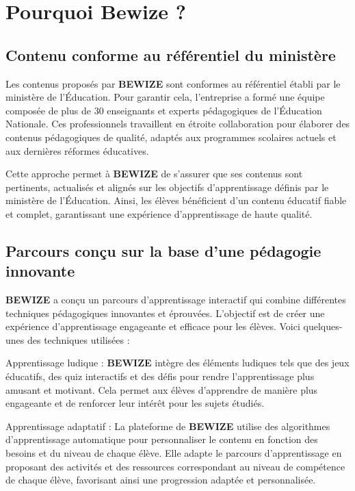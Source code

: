 \section{Pourquoi Bewize ?}
\subsection{Contenu conforme au référentiel du ministère}
Les contenus proposés par \textbf{BEWIZE} sont conformes au référentiel établi par le ministère de l'Éducation. Pour garantir cela, l'entreprise a formé une équipe composée de plus de 30 enseignants et experts pédagogiques de l'Éducation Nationale. Ces professionnels travaillent en étroite collaboration pour élaborer des contenus pédagogiques de qualité, adaptés aux programmes scolaires actuels et aux dernières réformes éducatives.

Cette approche permet à \textbf{BEWIZE} de s'assurer que ses contenus sont pertinents, actualisés et alignés sur les objectifs d'apprentissage définis par le ministère de l'Éducation. Ainsi, les élèves bénéficient d'un contenu éducatif fiable et complet, garantissant une expérience d'apprentissage de haute qualité.

\subsection{Parcours conçu sur la base d'une pédagogie innovante}
\textbf{BEWIZE} a conçu un parcours d'apprentissage interactif qui combine différentes techniques pédagogiques innovantes et éprouvées. L'objectif est de créer une expérience d'apprentissage engageante et efficace pour les élèves. Voici quelques-unes des techniques utilisées :

Apprentissage ludique : \textbf{BEWIZE} intègre des éléments ludiques tels que des jeux éducatifs, des quiz interactifs et des défis pour rendre l'apprentissage plus amusant et motivant. Cela permet aux élèves d'apprendre de manière plus engageante et de renforcer leur intérêt pour les sujets étudiés.

Apprentissage adaptatif : La plateforme de \textbf{BEWIZE} utilise des algorithmes d'apprentissage automatique pour personnaliser le contenu en fonction des besoins et du niveau de chaque élève. Elle adapte le parcours d'apprentissage en proposant des activités et des ressources correspondant au niveau de compétence de chaque élève, favorisant ainsi une progression adaptée et personnalisée.

